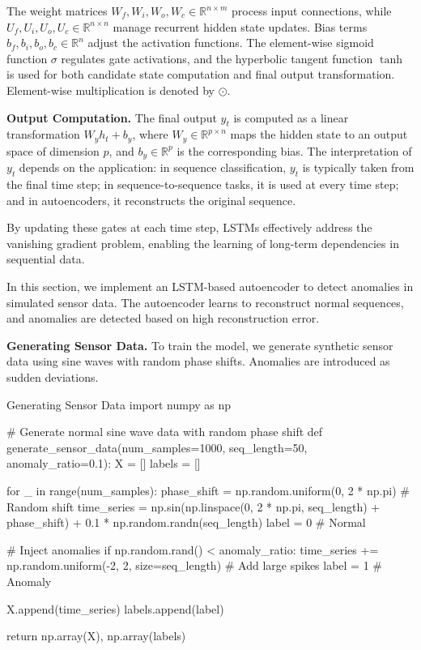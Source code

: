 The weight matrices \( W_f, W_i, W_o, W_c \in \mathbb{R}^{n \times m} \) process input connections, while \( U_f, U_i, U_o, U_c \in \mathbb{R}^{n \times n} \) manage recurrent hidden state updates. Bias terms \( b_f, b_i, b_o, b_c \in \mathbb{R}^{n} \) adjust the activation functions. The element-wise sigmoid function \( \sigma \) regulates gate activations, and the hyperbolic tangent function \( \tanh \) is used for both candidate state computation and final output transformation. Element-wise multiplication is denoted by \( \odot \).

{\bf Output Computation.} The final output \( y_t \) is computed as a linear transformation \( W_y h_t + b_y \), where \( W_y \in \mathbb{R}^{p \times n} \) maps the hidden state to an output space of dimension \( p \), and \( b_y \in \mathbb{R}^{p} \) is the corresponding bias. The interpretation of \( y_t \) depends on the application: in sequence classification, \( y_t \) is typically taken from the final time step; in sequence-to-sequence tasks, it is used at every time step; and in autoencoders, it reconstructs the original sequence.

By updating these gates at each time step, LSTMs effectively address the vanishing gradient problem, enabling the learning of long-term dependencies in sequential data.


\bigskip
In this section, we implement an LSTM-based autoencoder to detect anomalies in simulated sensor data. The autoencoder learns to reconstruct normal sequences, and anomalies are detected based on high reconstruction error.

{\bf Generating Sensor Data.} 
To train the model, we generate synthetic sensor data using sine waves with random phase shifts. Anomalies are introduced as sudden deviations.

\begin{codeonly}{Generating Sensor Data}
import numpy as np

# Generate normal sine wave data with random phase shift
def generate_sensor_data(num_samples=1000, seq_length=50, anomaly_ratio=0.1):
    X = []
    labels = []

    for _ in range(num_samples):
        phase_shift = np.random.uniform(0, 2 * np.pi)  # Random shift
        time_series = np.sin(np.linspace(0, 2 * np.pi, seq_length) + phase_shift) + 0.1 * np.random.randn(seq_length)
        label = 0  # Normal

        # Inject anomalies
        if np.random.rand() < anomaly_ratio:
            time_series += np.random.uniform(-2, 2, size=seq_length)  # Add large spikes
            label = 1  # Anomaly

        X.append(time_series)
        labels.append(label)

    return np.array(X), np.array(labels)
\end{codeonly}

